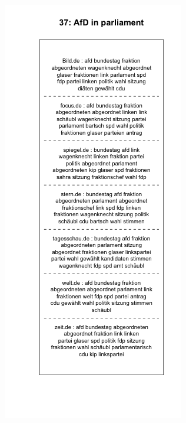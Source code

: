 \documentclass[12pt,a4paper,notitlepage]{article}
\begin{document}
\begin{figure}[H]
	\begin{center}
		\begin{subfigure}[normla]{0.49\textwidth}
			\includegraphics[width=\textwidth]{../figs/plotquote37.png}

\end{subfigure}
\end{center}
\end{figure}
\end{document}
